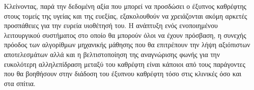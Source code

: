 Κλείνοντας, παρά την δεδομένη αξία που μπορεί να προσδώσει ο έξυπνος καθρέφτης στους τομείς της υγείας και της ευεξίας, εξακολουθούν να χρειάζονται ακόμη αρκετές προσπάθειες για την ευρεία υιοθέτησή του. Η ανάπτυξη ενός ενοποιημένου λειτουργικού συστήματος στο οποίο θα μπορούν όλοι να έχουν πρόσβαση, η συνεχής πρόοδος των αλγορίθμων μηχανικής μάθησης που θα επιτρέπουν την λήψη αξιόπιστων αποτελεσμάτων αλλά και η βελτιστοποίηση της αναγνώρισης φωνής για την ευκολότερη αλληλεπίδραση μεταξύ του καθρέφτη είναι κάποιοι από τους παράγοντες που θα βοηθήσουν στην διάδοση του έξυπνου καθρέφτη τόσο στις κλινικές όσο και στα σπίτια.